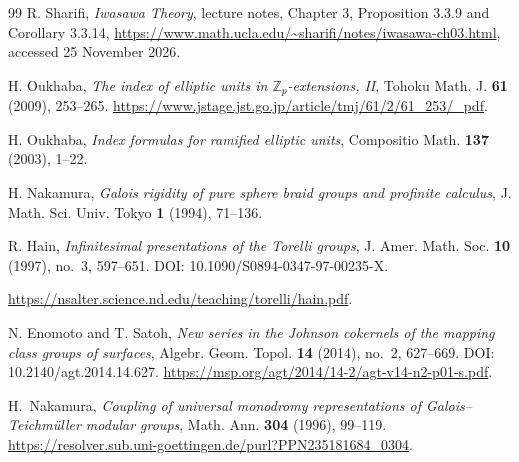 \documentclass[11pt]{article}
\theoremstyle{definition}\newtheorem{definition}[theorem]{Definition}
\begin{document}
\begin{thebibliography}{99}
R. Sharifi, \emph{Iwasawa Theory}, lecture notes, Chapter 3,
Proposition 3.3.9 and Corollary 3.3.14,
\url{https://www.math.ucla.edu/~sharifi/notes/iwasawa-ch03.html},
accessed 25 November 2026.

H. Oukhaba, \emph{The index of elliptic units in
\(\mathbb Z_p\)-extensions, II},
Tohoku Math. J. \textbf{61} (2009), 253--265.
\url{https://www.jstage.jst.go.jp/article/tmj/61/2/61_253/_pdf}.

H. Oukhaba, \emph{Index formulas for ramified elliptic units},
Compositio Math. \textbf{137} (2003), 1--22.

H. Nakamura, \emph{Galois rigidity of pure sphere braid groups
and profinite calculus}, J. Math. Sci. Univ. Tokyo
\textbf{1} (1994), 71--136.

R. Hain, \emph{Infinitesimal presentations of the Torelli groups},
J. Amer. Math. Soc. \textbf{10} (1997), no.~3, 597--651.
DOI: 10.1090/S0894-0347-97-00235-X.

\url{https://nsalter.science.nd.edu/teaching/torelli/hain.pdf}.

N. Enomoto and T. Satoh,
\emph{New series in the Johnson cokernels of the mapping
class groups of surfaces}, Algebr. Geom. Topol.
\textbf{14} (2014), no.~2, 627--669.
DOI: 10.2140/agt.2014.14.627.
\url{https://msp.org/agt/2014/14-2/agt-v14-n2-p01-s.pdf}.

H.~Nakamura, \emph{Coupling of universal monodromy representations
of Galois--Teichm\"uller modular groups}, Math. Ann.
\textbf{304} (1996), 99--119.
\url{https://resolver.sub.uni-goettingen.de/purl?PPN235181684_0304}.


\end{thebibliography}
\end{document}
